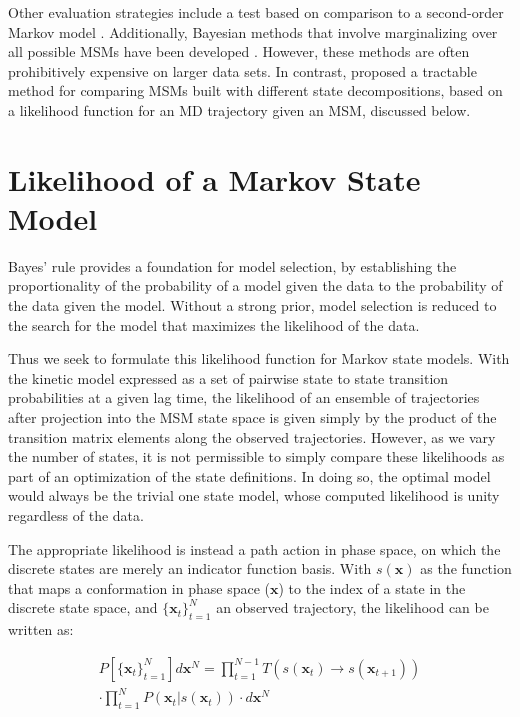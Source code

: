 \documentclass[journal=jpcbfk, layout=traditional, manuscript=article]{achemso}
\begin{document}
Other evaluation strategies include a test based on comparison to a second-order Markov model \cite{Park2006Validation}. Additionally, Bayesian methods that involve marginalizing over all possible MSMs have been developed \cite{Bacallado2009Bayesian, *Bacallado2011Bayesian}. However, these methods are often prohibitively expensive on larger data sets. In contrast, \citet{Kellogg2012Evaluation} proposed a tractable method for comparing MSMs built with different state decompositions, based on a likelihood function for an MD trajectory given an MSM, discussed below.

\section{Likelihood of a Markov State Model}
Bayes' rule provides a foundation for model selection, by establishing the proportionality of the probability of a model given the data to the probability of the data given the model. Without a strong prior, model selection is reduced to the search for the model that maximizes the likelihood of the data. 

Thus we seek to formulate this likelihood function for Markov state models. With the kinetic model expressed as a set of pairwise state to state transition probabilities at a given lag time, the likelihood of an ensemble of trajectories after projection into the MSM state space is given simply by the product of the transition matrix elements along the observed trajectories. However, as we vary the number of states, it is not permissible to simply compare these likelihoods as part of an optimization of the state definitions. In doing so, the optimal model would always be the trivial one state model, whose computed likelihood is unity regardless of the data.

The appropriate likelihood is instead a path action in phase space, on which the discrete states are merely an indicator function basis. With $s(\mathbf{x})$ as the function that maps a conformation in phase space ($\mathbf{x}$) to the index of a state in the discrete state space, and $\{\mathbf{x}_t\}_{t=1}^N$ an observed trajectory, the likelihood can be written as:

\begin{equation}
\begin{split}
P\left[\{\mathbf{x}_t\}_{t=1}^N\right] d\mathbf{x}^N = \prod_{t=1}^{N-1} T(s(\mathbf{x}_t) \rightarrow s(\mathbf{x}_{t+1})) \\
\cdot \prod_{t=1}^{N} P(\mathbf{x}_t | s(\mathbf{x}_t)) \cdot d\mathbf{x}^N
\label{eq:like}
\end{split}
\end{equation}
\end{document}
